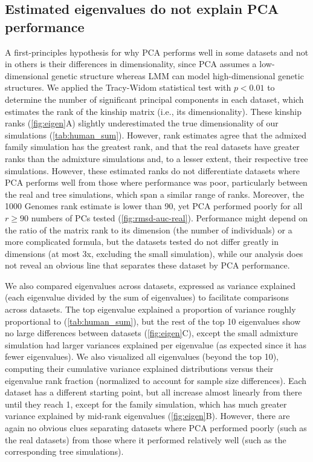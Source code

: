 \documentclass[11pt]{article}
\begin{document}
\subsection{Estimated eigenvalues do not explain PCA performance}

A first-principles hypothesis for why PCA performs well in some datasets and not in others is their differences in dimensionality, since PCA assumes a low-dimensional genetic structure whereas LMM can model high-dimensional genetic structures.
We applied the Tracy-Widom statistical test \citep{patterson_population_2006} with $p < 0.01$ to determine the number of significant principal components in each dataset, which estimates the rank of the kinship matrix (i.e., its dimensionality).
These kinship ranks (\cref{fig:eigen}A) slightly underestimated the true dimensionality of our simulations (\cref{tab:human_sum}).
However, rank estimates agree that the admixed family simulation has the greatest rank, and that the real datasets have greater ranks than the admixture simulations and, to a lesser extent, their respective tree simulations.
However, these estimated ranks do not differentiate datasets where PCA performs well from those where performance was poor, particularly between the real and tree simulations, which span a similar range of ranks.
Moreover, the 1000 Genomes rank estimate is lower than 90, yet PCA performed poorly for all $r \ge 90$ numbers of PCs tested (\cref{fig:rmsd-auc-real}).
Performance might depend on the ratio of the matrix rank to its dimension (the number of individuals) or a more complicated formula, but the datasets tested do not differ greatly in dimensions (at most 3x, excluding the small simulation), while our analysis does not reveal an obvious line that separates these dataset by PCA performance.

We also compared eigenvalues across datasets, expressed as variance explained (each eigenvalue divided by the sum of eigenvalues) to facilitate comparisons across datasets.
The top eigenvalue explained a proportion of variance roughly proportional to \Fst (\cref{tab:human_sum}), but the rest of the top 10 eigenvalues show no large differences between datasets (\cref{fig:eigen}C), except the small admixture simulation had larger variances explained per eigenvalue (as expected since it has fewer eigenvalues).
We also visualized all eigenvalues (beyond the top 10), computing their cumulative variance explained distributions versus their eigenvalue rank fraction (normalized to account for sample size differences).
Each dataset has a different starting point, but all increase almost linearly from there until they reach 1, except for the family simulation, which has much greater variance explained by mid-rank eigenvalues (\cref{fig:eigen}B).
However, there are again no obvious clues separating datasets where PCA performed poorly (such as the real datasets) from those where it performed relatively well (such as the corresponding tree simulations).
\end{document}
